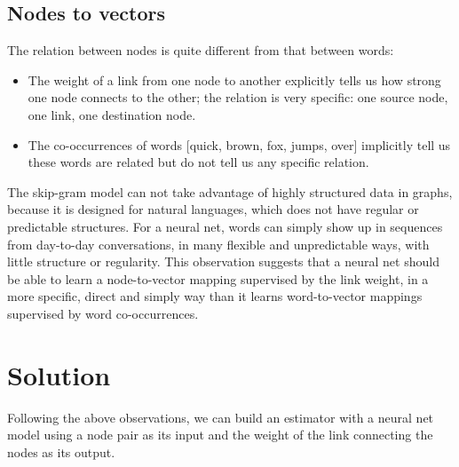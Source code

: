 \documentclass[letterpaper]{article}
\begin{document}
\subsection{Nodes to vectors}
The relation between nodes is quite different from that between words:
\begin{itemize}
	\item The weight of a link from one node to another explicitly tells us
	how strong one node connects to the other;
	the relation is very specific: one source node, one link, one destination node.
	\item The co-occurrences of words [quick, brown, fox, jumps, over] 
	implicitly tell us these words are related but do not tell us any 
	specific relation.
\end{itemize}
The skip-gram model can not take advantage of highly structured data in graphs,
because it is designed for natural languages,
which does not have regular or predictable structures.
For a neural net, 
words can simply show up in sequences from day-to-day conversations,
in many flexible and unpredictable ways, with little structure or regularity.
This observation suggests that a neural net should be able to learn a 
node-to-vector mapping supervised by the link weight,
in a more specific, direct and simply way than it learns word-to-vector 
mappings supervised by word co-occurrences.

\section{Solution}
Following the above observations,
we can build an estimator with a neural net model
using a node pair as its input
and the weight of the link connecting the nodes as its output.
\end{document}
